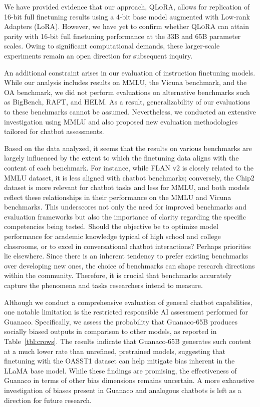 We have provided evidence that our approach, \textsc{QLoRA}, allows for replication of 16-bit full finetuning results using a 4-bit base model augmented with Low-rank Adapters (LoRA). However, we have yet to confirm whether \textsc{QLoRA} can attain parity with 16-bit full finetuning performance at the 33B and 65B parameter scales. Owing to significant computational demands, these larger-scale experiments remain an open direction for subsequent inquiry.

An additional constraint arises in our evaluation of instruction finetuning models. While our analysis includes results on MMLU, the Vicuna benchmark, and the OA benchmark, we did not perform evaluations on alternative benchmarks such as BigBench, RAFT, and HELM. As a result, generalizability of our evaluations to these benchmarks cannot be assumed. Nevertheless, we conducted an extensive investigation using MMLU and also proposed new evaluation methodologies tailored for chatbot assessments.

Based on the data analyzed, it seems that the results on various benchmarks are largely influenced by the extent to which the finetuning data aligns with the content of each benchmark. For instance, while FLAN v2 is closely related to the MMLU dataset, it is less aligned with chatbot benchmarks; conversely, the Chip2 dataset is more relevant for chatbot tasks and less for MMLU, and both models reflect these relationships in their performance on the MMLU and Vicuna benchmarks. This underscores not only the need for improved benchmarks and evaluation frameworks but also the importance of clarity regarding the specific competencies being tested. Should the objective be to optimize model performance for academic knowledge typical of high school and college classrooms, or to excel in conversational chatbot interactions? Perhaps priorities lie elsewhere. Since there is an inherent tendency to prefer existing benchmarks over developing new ones, the choice of benchmarks can shape research directions within the community. Therefore, it is crucial that benchmarks accurately capture the phenomena and tasks researchers intend to measure.

Although we conduct a comprehensive evaluation of general chatbot capabilities, one notable limitation is the restricted responsible AI assessment performed for {Guanaco}. Specifically, we assess the probability that {Guanaco}-65B produces socially biased outputs in comparison to other models, as reported in Table~\ref{tbl:crows}. The results indicate that {Guanaco}-65B generates such content at a much lower rate than unrefined, pretrained models, suggesting that finetuning with the OASST1 dataset can help mitigate bias inherent in the LLaMA base model. While these findings are promising, the effectiveness of {Guanaco} in terms of other bias dimensions remains uncertain. A more exhaustive investigation of biases present in {Guanaco} and analogous chatbots is left as a direction for future research.

